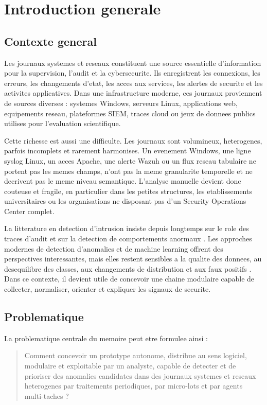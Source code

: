 \chapter{Introduction generale}

\section{Contexte general}
Les journaux systemes et reseaux constituent une source essentielle d'information pour la supervision, l'audit et la cybersecurite. Ils enregistrent les connexions, les erreurs, les changements d'etat, les acces aux services, les alertes de securite et les activites applicatives. Dans une infrastructure moderne, ces journaux proviennent de sources diverses : systemes Windows, serveurs Linux, applications web, equipements reseau, plateformes SIEM, traces cloud ou jeux de donnees publics utilises pour l'evaluation scientifique.

Cette richesse est aussi une difficulte. Les journaux sont volumineux, heterogenes, parfois incomplets et rarement harmonises. Un evenement Windows, une ligne syslog Linux, un acces Apache, une alerte Wazuh ou un flux reseau tabulaire ne portent pas les memes champs, n'ont pas la meme granularite temporelle et ne decrivent pas le meme niveau semantique. L'analyse manuelle devient donc couteuse et fragile, en particulier dans les petites structures, les etablissements universitaires ou les organisations ne disposant pas d'un Security Operations Center complet.

La litterature en detection d'intrusion insiste depuis longtemps sur le role des traces d'audit et sur la detection de comportements anormaux \cite{denning1987intrusion,axelsson2000intrusion}. Les approches modernes de detection d'anomalies et de machine learning offrent des perspectives interessantes, mais elles restent sensibles a la qualite des donnees, au desequilibre des classes, aux changements de distribution et aux faux positifs \cite{chandola2009anomaly,buczak2016survey,khraisat2019survey}. Dans ce contexte, il devient utile de concevoir une chaine modulaire capable de collecter, normaliser, orienter et expliquer les signaux de securite.

\section{Problematique}
La problematique centrale du memoire peut etre formulee ainsi :

\begin{quote}
Comment concevoir un prototype autonome, distribue au sens logiciel, modulaire et exploitable par un analyste, capable de detecter et de prioriser des anomalies candidates dans des journaux systemes et reseaux heterogenes par traitements periodiques, par micro-lots et par agents multi-taches ?
\end{quote}

